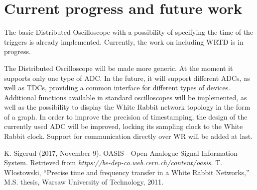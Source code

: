 \documentclass[conference]{IEEEtran}
\begin{document}
\section{Current progress and future work}
The basic Distributed Oscilloscope with a possibility of specifying the time of the triggers is already implemented. Currently, the work on including WRTD is in progress. 

The Distributed Oscilloscope will be made more generic. At the moment it supports only one type of ADC. In the future, it will support different ADCs, as well as TDCs, providing a common interface for different types of devices. Additional functions available in standard oscilloscopes will be implemented, as well as the possibility to display the White Rabbit network topology in the form of a graph.
In order to improve the precision of timestamping, the design of the currently used ADC will be improved, locking its sampling clock to the White Rabbit clock. Support for communication directly over WR will be added at last. 




\begin{thebibliography}{00}
 K. Sigerud (2017, November 9). OASIS - Open Analogue Signal Information System. Retrieved from \textit{https://be-dep-co.web.cern.ch/content/oasis.}
 T. Włostowski, ``Precise time and frequency transfer in a White Rabbit Networks,'' M.S. thesis, Warsaw University of Technology, 2011.
\end{thebibliography}
\end{document}
